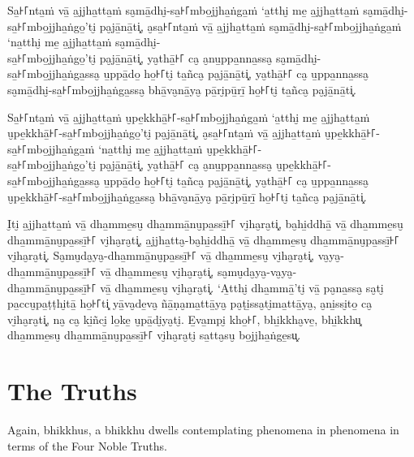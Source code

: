 Sa̱꜔꜒nta̱ṁ vā̱ a̱jjha̱tta̱ṁ sa̮mā̱dhi̮-sa̱꜔꜒mbo̱jjha̱ṅga̱ṁ ‘a̱tthi̮ me̱ a̱jjha̱tta̱ṁ sa̮mā̱dhi̮-sa̱꜔꜒mbo̱jjha̱ṅgo̱’ti̮ pa̮jā̱nā̱ti͓,
a̮sa̱꜔꜒nta̱ṁ vā̱ a̱jjha̱tta̱ṁ sa̮mā̱dhi̮-sa̱꜔꜒mbo̱jjha̱ṅga̱ṁ ‘na̱tthi̮ me̱ a̱jjha̱tta̱ṁ sa̮mā̱dhi̮-\\ sa̱꜔꜒mbo̱jjha̱ṅgo̱’ti̮ pa̮jā̱nā̱ti͓,
ya̮thā̱꜔꜒ ca̮ a̮nu̱ppa̱nna̱ssa̮ sa̮mā̱dhi̮-\\ sa̱꜔꜒mbo̱jjha̱ṅga̱ssa̮ u̱ppā̱do̱ ho̱꜔꜒ti̮ ta̱ñca̮ pa̮jā̱nā̱ti͓,
ya̮thā̱꜔꜒ ca̮ u̱ppa̱nna̱ssa̮ sa̮mā̱dhi̮-sa̱꜔꜒mbo̱jjha̱ṅga̱ssa̮ bhā̱va̮nā̱ya̮ pā̱ri̮pū̱rī̱ ho̱꜔꜒ti̮ ta̱ñca̮ pa̮jā̱nā̱ti͓.

Sa̱꜔꜒nta̱ṁ vā̱ a̱jjha̱tta̱ṁ u̮pe̱kkhā̱꜔꜒-sa̱꜔꜒mbo̱jjha̱ṅga̱ṁ ‘a̱tthi̮ me̱ a̱jjha̱tta̱ṁ u̮pe̱kkhā̱꜔꜒-sa̱꜔꜒mbo̱jjha̱ṅgo̱’ti̮ pa̮jā̱nā̱ti͓,
a̮sa̱꜔꜒nta̱ṁ vā̱ a̱jjha̱tta̱ṁ u̮pe̱kkhā̱꜔꜒-sa̱꜔꜒mbo̱jjha̱ṅga̱ṁ ‘na̱tthi̮ me̱ a̱jjha̱tta̱ṁ u̮pe̱kkhā̱꜔꜒-\\ sa̱꜔꜒mbo̱jjha̱ṅgo̱’ti̮ pa̮jā̱nā̱ti͓,
ya̮thā̱꜔꜒ ca̮ a̮nu̱ppa̱nna̱ssa̮ u̮pe̱kkhā̱꜔꜒-\\ sa̱꜔꜒mbo̱jjha̱ṅga̱ssa̮ u̱ppā̱do̱ ho̱꜔꜒ti̮ ta̱ñca̮ pa̮jā̱nā̱ti͓,
ya̮thā̱꜔꜒ ca̮ u̱ppa̱nna̱ssa̮ u̮pe̱kkhā̱꜔꜒-sa̱꜔꜒mbo̱jjha̱ṅga̱ssa̮ bhā̱va̮nā̱ya̮ pā̱ri̮pū̱rī̱ ho̱꜔꜒ti̮ ta̱ñca̮ pa̮jā̱nā̱ti͓.

I̮ti̮ a̱jjha̱tta̱ṁ vā̱ dha̱mme̱su̮ dha̱mmā̱nu̮pa̱ssī̱꜔꜒ vi̮ha̮ra̮ti͓,
ba̮hi̱ddhā̱ vā̱ dha̱mme̱su̮ dha̱mmā̱nu̮pa̱ssī̱꜔꜒ vi̮ha̮ra̮ti͓,
a̱jjha̱tta̮-ba̮hi̱ddhā̱ vā̱ dha̱mme̱su̮ dha̱mmā̱nu̮pa̱ssī̱꜔꜒ vi̮ha̮ra̮ti͓.
Sa̮mu̮da̮ya̮-dha̱mmā̱nu̮pa̱ssī̱꜔꜒ vā̱ dha̱mme̱su̮ vi̮ha̮ra̮ti͓,
va̮ya̮-dha̱mmā̱nu̮pa̱ssī̱꜔꜒ vā̱ dha̱mme̱su̮ vi̮ha̮ra̮ti͓,
sa̮mu̮da̮ya̮-va̮ya̮-\\ dha̱mmā̱nu̮pa̱ssī̱꜔꜒ vā̱ dha̱mme̱su̮ vi̮ha̮ra̮ti͓.
‘A̱tthi̮ dha̱mmā̱’ti̮ vā̱ pa̮na̱ssa̮ sa̮ti̮ pa̱ccu̮pa̱ṭṭhi̮tā̱ ho̱꜔꜒ti͓
yā̱va̮de̱va̮ ñā̱ṇa̮ma̱ttā̱ya̮ pa̮ṭi̱ssa̮ti̮ma̱ttā̱ya̮, a̮ni̱ssi̮to̱ ca̮ vi̮ha̮ra̮ti͓,
na̮ ca̮ ki̱ñci̮ lo̱ke̱ u̮pā̱di̮ya̮ti̮. E̱va̱mpi̮ kho̱꜔꜒, bhi̱kkha̮ve̱, bhi̱kkhu͓
dha̱mme̱su̮ dha̱mmā̱nu̮pa̱ssī̱꜔꜒ vi̮ha̮ra̮ti̮ sa̱tta̮su̮ bo̱jjha̱ṅge̱su͓.

\enlargethispage{\baselineskip}


\englishPage
\section*{The Truths}%

Again, bhikkhus, a bhikkhu dwells contemplating phenomena in phenomena in terms
of the Four Noble Truths.

